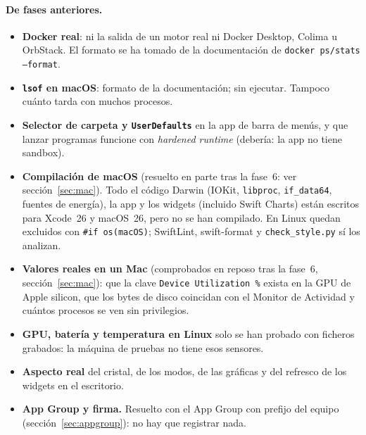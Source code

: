\documentclass[11pt,a4paper]{article}
\begin{document}
\paragraph{De fases anteriores.}
\begin{itemize}
  \item \textbf{Docker real}: ni la salida de un motor real ni Docker
    Desktop, Colima u OrbStack. El formato se ha tomado de la
    documentación de \texttt{docker ps/stats --format}.
  \item \textbf{\texttt{lsof} en macOS}: formato de la documentación;
    sin ejecutar. Tampoco cuánto tarda con muchos procesos.
  \item \textbf{Selector de carpeta y \texttt{UserDefaults}} en la
    app de barra de menús, y que lanzar programas funcione con
    \emph{hardened runtime} (debería: la app no tiene sandbox).
  \item \textbf{Compilación de macOS} (resuelto en parte tras la
    fase~6: ver sección~\ref{sec:mac}). Todo el código Darwin (IOKit,
    \texttt{libproc}, \texttt{if\_data64}, fuentes de energía), la
    app y los widgets (incluido Swift Charts) están escritos para
    Xcode~26 y macOS~26, pero no se han compilado. En Linux quedan
    excluidos con \texttt{\#if os(macOS)}; SwiftLint, swift-format y
    \texttt{check\_style.py} sí los analizan.
  \item \textbf{Valores reales en un Mac} (comprobados en reposo tras
    la fase~6, sección~\ref{sec:mac}): que la clave
    \texttt{Device Utilization~\%} exista en la GPU de Apple silicon,
    que los bytes de disco coincidan con el Monitor de Actividad y
    cuántos procesos se ven sin privilegios.
  \item \textbf{GPU, batería y temperatura en Linux} solo se han
    probado con ficheros grabados: la máquina de pruebas no tiene
    esos sensores.
  \item \textbf{Aspecto real} del cristal, de los modos, de las
    gráficas y del refresco de los widgets en el escritorio.
  \item \textbf{App Group y firma.} Resuelto con el App Group con
    prefijo del equipo (sección~\ref{sec:appgroup}): no hay que
    registrar nada.
\end{itemize}
\end{document}
